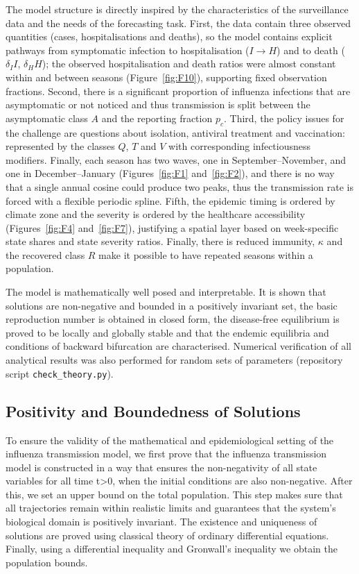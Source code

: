\documentclass[12pt,a4paper]{article}
\theoremstyle{definition}
\theoremstyle{remark}
\begin{document}
The model structure is directly inspired by the characteristics of the surveillance data and the needs of the forecasting task. First, the data contain three observed quantities (cases, hospitalisations and deaths), so the model contains explicit pathways from symptomatic infection to hospitalisation ($I\to H$) and to death ($\delta_I I$, $\delta_H H$); the observed hospitalisation and death ratios were almost constant within and between seasons (Figure~\ref{fig:F10}), supporting fixed observation fractions. Second, there is a significant proportion of influenza infections that are asymptomatic or not noticed and thus transmission is split between the asymptomatic class $A$ and the reporting fraction $p_c$. Third, the policy issues for the challenge are questions about isolation, antiviral treatment and vaccination: represented by the classes $Q$, $T$ and $V$ with corresponding infectiousness modifiers. Finally, each season has two waves, one in September--November, and one in December--January (Figures~\ref{fig:F1} and~\ref{fig:F2}), and there is no way that a single annual cosine could produce two peaks, thus the transmission rate is forced with a flexible periodic spline. Fifth, the epidemic timing is ordered by climate zone and the severity is ordered by the healthcare accessibility (Figures~\ref{fig:F4} and~\ref{fig:F7}), justifying a spatial layer based on week-specific state shares and state severity ratios. Finally, there is reduced immunity, $\kappa$ and the recovered class $R$ make it possible to have repeated seasons within a population.

The model is mathematically well posed and interpretable. It is shown that solutions are non-negative and bounded in a positively invariant set, the basic reproduction number is obtained in closed form, the disease-free equilibrium is proved to be locally and globally stable and that the endemic equilibria and conditions of backward bifurcation are characterised. Numerical verification of all analytical results was also performed for random sets of parameters (repository script \texttt{check\_theory.py}).




\subsection{Positivity and Boundedness of Solutions}


To ensure the validity of the mathematical and epidemiological setting of the influenza transmission model, we first prove that the influenza transmission model is constructed in a way that ensures the non-negativity of all state variables for all time t>0, when the initial conditions are also non-negative. After this, we set an upper bound on the total population. This step makes sure that all trajectories remain within realistic limits and guarantees that the system's biological domain is positively invariant. The existence and uniqueness of solutions are proved using classical theory of ordinary differential equations. Finally, using a differential inequality and Gronwall's inequality \cite{hartman2002ode} we obtain the population bounds.
\end{document}
